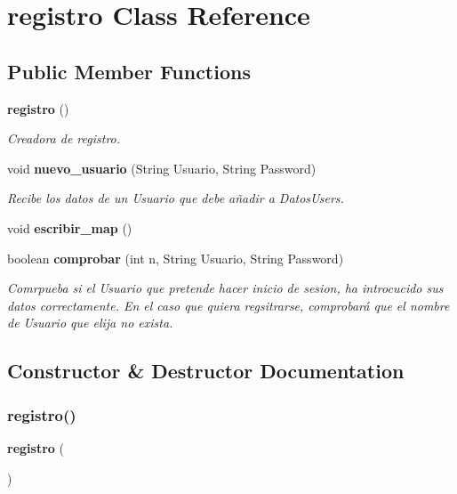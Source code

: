 \section{registro Class Reference}
\label{class_dominio_1_1clases_1_1registro}
\subsection*{Public Member Functions}
\begin{DoxyCompactItemize}
\item 
\textbf{ registro} ()
\begin{DoxyCompactList}\small\item\em Creadora de registro. \end{DoxyCompactList}\item 
void \textbf{ nuevo\+\_\+usuario} (String Usuario, String Password)
\begin{DoxyCompactList}\small\item\em Recibe los datos de un Usuario que debe añadir a Datos\+Users. \end{DoxyCompactList}\item 
void \textbf{ escribir\+\_\+map} ()
\item 
boolean \textbf{ comprobar} (int n, String Usuario, String Password)
\begin{DoxyCompactList}\small\item\em Comrpueba si el Usuario que pretende hacer inicio de sesion, ha introcucido sus datos correctamente. En el caso que quiera regsitrarse, comprobará que el nombre de Usuario que elija no exista. \end{DoxyCompactList}\end{DoxyCompactItemize}


\subsection{Constructor \& Destructor Documentation}
\mbox{\label{class_dominio_1_1clases_1_1registro_ab434f6ce08eaf748ae10d7991149e7dd}} 
\subsubsection{registro()}
{\footnotesize\ttfamily \textbf{ registro} (\begin{DoxyParamCaption}{ }\end{DoxyParamCaption})\hspace{0.3cm}{\ttfamily [inline]}}



